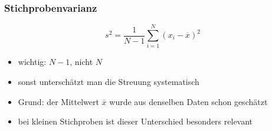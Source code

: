 \documentclass[aspectratio=169,professionalfonts]{beamer}
\begin{document}
\begin{frame}
  \frametitle{Stichprobenvarianz}

  \[
    s^2=\frac{1}{N-1}\sum_{i=1}^{N}(x_i-\overline x)^2
  \]

  \vspace{0.3cm}

  \begin{itemize}
    \item wichtig: \(N-1\), nicht \(N\)
    \item sonst untersch\"atzt man die Streuung systematisch
    \item Grund: der Mittelwert \(\overline x\) wurde aus denselben Daten schon gesch\"atzt
    \item bei kleinen Stichproben ist dieser Unterschied besonders relevant
  \end{itemize}
\end{frame}
\end{document}
